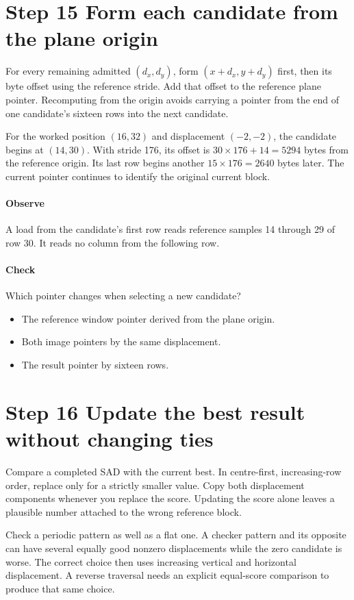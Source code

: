 \section{Step 15 Form each candidate from the plane origin}\label{h263-motion-s05}
For every remaining admitted $(d_x,d_y)$, form $(x+d_x,y+d_y)$ first, then its
byte offset using the reference stride. Add that offset to the reference plane
pointer. Recomputing from the origin avoids carrying a pointer from the end of
one candidate's sixteen rows into the next candidate.

For the worked position $(16,32)$ and displacement $(-2,-2)$, the candidate begins
at $(14,30)$. With stride 176, its offset is $30\times176+14=5294$ bytes from the
reference origin. Its last row begins another $15\times176=2640$ bytes later.
The current pointer continues to identify the original current block.

\paragraph{Observe} A load from the candidate's first row reads reference
samples 14 through 29 of row 30. It reads no column from the following row.
\paragraph{Check} Which pointer changes when selecting a new candidate?
\begin{itemize}
  \item[A.] The reference window pointer derived from the plane origin.
  \item[B.] Both image pointers by the same displacement.
  \item[C.] The result pointer by sixteen rows.
\end{itemize}

\section{Step 16 Update the best result without changing ties}\label{h263-motion-s06}
Compare a completed SAD with the current best. In centre-first, increasing-row
order, replace only for a strictly smaller value. Copy both displacement
components whenever you replace the score. Updating the score alone leaves a
plausible number attached to the wrong reference block.

Check a periodic pattern as well as a flat one. A checker pattern and its
opposite can have several equally good nonzero displacements while the zero
candidate is worse. The correct choice then uses increasing vertical and
horizontal displacement. A reverse traversal needs an explicit equal-score
comparison to produce that same choice.

